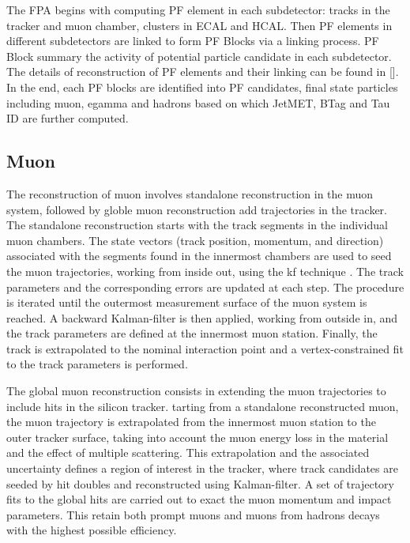 The FPA begins with computing PF element in each subdetector: tracks in the tracker and muon chamber, clusters in ECAL and HCAL. Then PF elements in different subdetectors are linked to form PF Blocks via a linking process. PF Block summary the activity of potential particle candidate in each subdetector. The details of reconstruction of PF elements and their linking can be found in []. In the end, each PF blocks are identified into PF candidates, final state particles including muon, egamma and hadrons based on which JetMET, BTag and Tau ID are further computed.





\subsection{Muon}

The reconstruction of muon involves standalone reconstruction in the muon system, followed by globle muon reconstruction add trajectories in the tracker. The standalone reconstruction starts with the track segments in the individual muon chambers. The state vectors (track position, momentum, and direction) associated with the segments found in the innermost chambers are used to seed the muon trajectories, working from inside out, using the \acrfull{kf} technique \cite{tech:kf:Fruhwirth:1987fm}. The track parameters and the corresponding errors are updated at each step. The procedure is iterated until the outermost measurement surface of the muon system is reached. A backward Kalman-filter is then applied, working from outside in, and the track parameters are defined at the innermost muon station. Finally, the track is extrapolated to the nominal interaction point and a vertex-constrained fit to the track parameters is performed.

The global muon reconstruction consists in extending the muon trajectories to include hits in the silicon tracker. tarting from a standalone reconstructed muon, the muon trajectory is extrapolated from the innermost muon station to the outer tracker surface, taking into account the muon energy loss in the material and the effect of multiple scattering. This extrapolation and the associated uncertainty defines a region of interest in the tracker, where track candidates are seeded by hit doubles and reconstructed using Kalman-filter. A set of trajectory fits to the global hits are carried out to exact the muon momentum and impact parameters. This retain both prompt muons and muons from hadrons decays with the highest possible efficiency.

